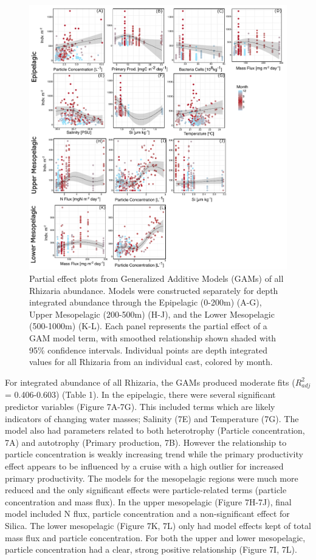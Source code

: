 \documentclass[
]{article}
\begin{document}
\begin{figure}[H]

{\centering \includegraphics{images/06_tot-partials.pdf}

}

\caption{Partial effect plots from Generalized Additive Models (GAMs) of
all Rhizaria abundance. Models were constructed separately for depth
integrated abundance through the Epipelagic (0-200m) (A-G), Upper
Mesopelagic (200-500m) (H-J), and the Lower Mesopelagic (500-1000m)
(K-L). Each panel represents the partial effect of a GAM model term,
with smoothed relationship shown shaded with 95\% confidence intervals.
Individual points are depth integrated values for all Rhizaria from an
individual cast, colored by month.}

\end{figure}%

For integrated abundance of all Rhizaria, the GAMs produced moderate
fits (\(R^2_{adj}\) = 0.406-0.603) (Table 1). In the epipelagic, there
were several significant predictor variables (Figure 7A-7G). This
included terms which are likely indicators of changing water masses;
Salinity (7E) and Temperature (7G). The model also had parameters
related to both heterotrophy (Particle concentration, 7A) and autotrophy
(Primary production, 7B). However the relationship to particle
concentration is weakly increasing trend while the primary productivity
effect appears to be influenced by a cruise with a high outlier for
increased primary productivity. The models for the mesopelagic regions
were much more reduced and the only significant effects were
particle-related terms (particle concentration and mass flux). In the
upper mesopelagic (Figure 7H-7J), final model included N flux, particle
concentration and a non-significant effect for Silica. The lower
mesopelagic (Figure 7K, 7L) only had model effects kept of total mass
flux and particle concentration. For both the upper and lower
mesopelagic, particle concentration had a clear, strong positive
relationship (Figure 7I, 7L).
\end{document}
